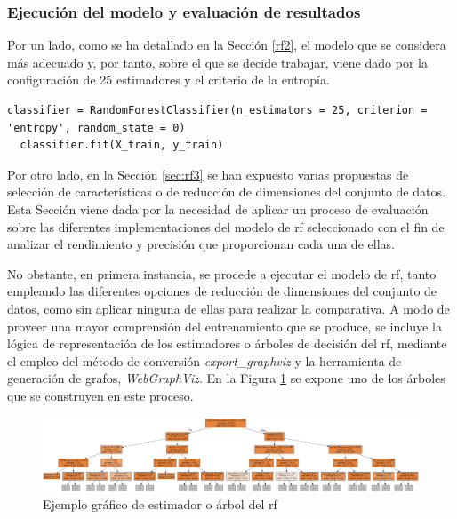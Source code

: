 \subsubsection{Ejecución del modelo y evaluación de resultados}
\label{sec:rf4}

Por un lado, como se ha detallado en la Sección \ref{rf2}, el modelo que se considera más adecuado y, por tanto, sobre el que se decide trabajar, viene dado por la configuración de 25 estimadores y el criterio de la entropía.

\vspace{3mm}

\begin{lstlisting}[style=Python, caption={Clasificador RF seleccionado}]
  classifier = RandomForestClassifier(n_estimators = 25, criterion = 'entropy', random_state = 0) 
  classifier.fit(X_train, y_train)
\end{lstlisting}
  
\vspace{3mm}

Por otro lado, en la Sección \ref{sec:rf3} se han expuesto varias propuestas de selección de características o de reducción de dimensiones del conjunto de datos. Esta Sección viene dada por la necesidad de aplicar un proceso de evaluación sobre las diferentes implementaciones del modelo de \gls{rf} seleccionado con el fin de analizar el rendimiento y precisión que proporcionan cada una de ellas. 

\vspace{3mm}

No obstante, en primera instancia, se procede a ejecutar el modelo de \gls{rf}, tanto empleando las diferentes opciones de reducción de dimensiones del conjunto de datos, como sin aplicar ninguna de ellas para realizar la comparativa. A modo de proveer una mayor comprensión del entrenamiento que se produce, se incluye la lógica de representación de los estimadores o árboles de decisión del \gls{rf}, mediante el empleo del método de conversión \textit{export\_graphviz} \cite{graphviz2} y la herramienta de generación de grafos, \textit{WebGraphViz}. En la Figura \ref{fig:tree} se expone uno de los árboles que se construyen en este proceso.

\vspace{3mm}

\begin{figure}
  \centering
  \includegraphics[width=1\textwidth]{img/desarrollo/rf/tree2.png}
  \caption{Ejemplo gráfico de estimador o árbol del \gls{rf} \cite{graphviz}}
  \label{fig:tree}
\end{figure}

